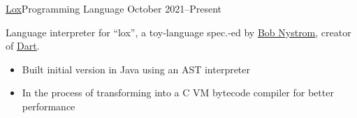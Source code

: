 \documentclass[10pt,a4paper,ragged2e,withhyper]{altacv}
\begin{document}
\begin{paracol}{2}
		\divider

		\cvevent
		{\href{https://github.com/jaacko-torus/lox}{\uline{Lox}}{\hr}Programming Language}
		{{\CVTagJava}{\CVTagC}}
		{October 2021--Present}{}
		\vspace{-0.3cm}
		\begin{justify}
			Language interpreter for ``lox'', a toy-language spec.-ed by \href{https://github.com/munificent}{\uline{Bob Nystrom}}, creator of \href{https://en.wikipedia.org/wiki/Dart_(programming_language)}{\uline{Dart}}.
		\end{justify}
		\vspace{-0.2cm}
		\smallskip
		\begin{itemize}
			\item Built initial version in Java using an AST interpreter
			\item In the process of transforming into a C VM bytecode compiler for better performance
		\end{itemize}


	\end{paracol}
\end{document}
